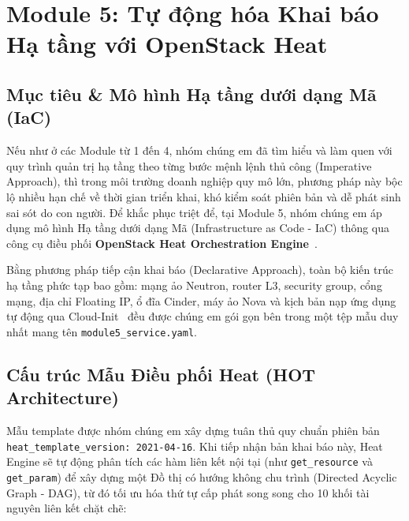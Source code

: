 \section{Module 5: Tự động hóa Khai báo Hạ tầng với OpenStack Heat}

\subsection{Mục tiêu \& Mô hình Hạ tầng dưới dạng Mã (IaC)}
Nếu như ở các Module từ 1 đến 4, nhóm chúng em đã tìm hiểu và làm quen với quy trình quản trị hạ tầng theo từng bước mệnh lệnh thủ công (Imperative Approach), thì trong môi trường doanh nghiệp quy mô lớn, phương pháp này bộc lộ nhiều hạn chế về thời gian triển khai, khó kiểm soát phiên bản và dễ phát sinh sai sót do con người. Để khắc phục triệt để, tại Module 5, nhóm chúng em áp dụng mô hình Hạ tầng dưới dạng Mã (Infrastructure as Code - IaC) thông qua công cụ điều phối \textbf{OpenStack Heat Orchestration Engine}~\cite{heat_hot_guide}.

Bằng phương pháp tiếp cận khai báo (Declarative Approach), toàn bộ kiến trúc hạ tầng phức tạp bao gồm: mạng ảo Neutron, router L3, security group, cổng mạng, địa chỉ Floating IP, ổ đĩa Cinder, máy ảo Nova và kịch bản nạp ứng dụng tự động qua Cloud-Init~\cite{cloudinit_docs} đều được chúng em gói gọn bên trong một tệp mẫu duy nhất mang tên \texttt{module5\_service.yaml}.

\subsection{Cấu trúc Mẫu Điều phối Heat (HOT Architecture)}
Mẫu template được nhóm chúng em xây dựng tuân thủ quy chuẩn phiên bản \nolinkurl{heat_template_version: 2021-04-16}. Khi tiếp nhận bản khai báo này, Heat Engine sẽ tự động phân tích các hàm liên kết nội tại (như \texttt{get\_resource} và \texttt{get\_param}) để xây dựng một Đồ thị có hướng không chu trình (Directed Acyclic Graph - DAG), từ đó tối ưu hóa thứ tự cấp phát song song cho 10 khối tài nguyên liên kết chặt chẽ:

